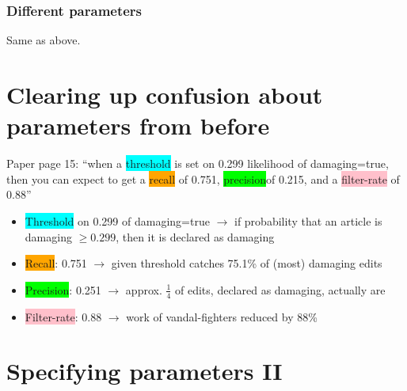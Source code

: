 \documentclass[12pt,a4paper]{article}
\begin{document}
\subsubsection{Different parameters}
Same as above.
\section{Clearing up confusion about parameters from before}
Paper page 15: ``when a \colorbox{cyan}{threshold} is set on 0.299 likelihood of damaging=true,
then you can expect to get a  \colorbox{orange}{recall} of 0.751,  \colorbox{lime}{precision}of 0.215, and a \colorbox{pink}{filter-rate} of 0.88''
\begin{itemize}
\item \colorbox{cyan}{Threshold} on 0.299 of damaging=true $\rightarrow$ if probability that an article is damaging $\geq 0.299$, then it is declared as damaging
\item  \colorbox{orange}{Recall}: 0.751 $\rightarrow$ given threshold catches 75.1\% of (most) damaging edits
\item  \colorbox{lime}{Precision}: 0.251 $\rightarrow$ approx. $\frac{1}{4}$ of edits, declared as damaging, actually are 
\item \colorbox{pink}{Filter-rate}: 0.88 $\rightarrow$ work of vandal-fighters reduced by 88\%
\end{itemize}
\section{Specifying parameters II}
\end{document}
